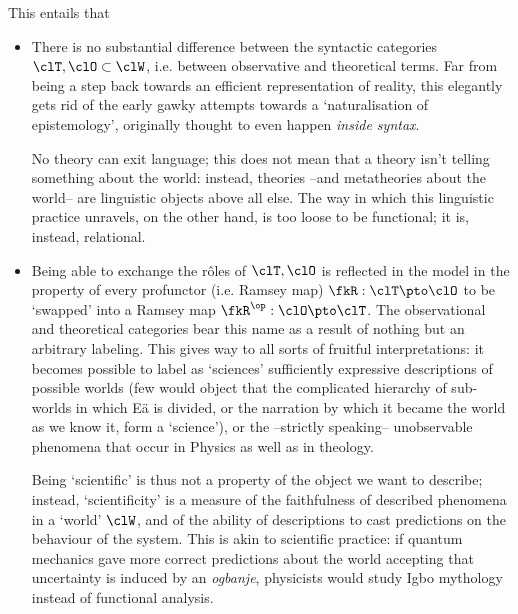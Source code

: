 This entails that
\begin{itemize}
	\item There is no substantial difference between the syntactic categories $\clT,\clO\subset \clW$, i.e. between observative and theoretical terms. Far from being a step back towards an efficient representation of reality, this elegantly gets rid of the early gawky attempts towards a `naturalisation of epistemology', originally thought to even happen \emph{inside syntax}.

	      No theory can exit language; this does not mean that a theory isn't telling something about the world: instead, theories --and metatheories about the world-- are linguistic objects above all else. The way in which this linguistic practice unravels, on the other hand, is too loose to be functional; it is, instead, relational.
	\item Being able to exchange the r\^oles of $\clT,\clO$ is reflected in the model in the property of every profunctor (i.e. Ramsey map) $\fkR : \clT \pto \clO$ to be `swapped' into a Ramsey map $\fkR^\op : \clO \pto \clT$. The observational and theoretical categories bear this name as a result of nothing but an arbitrary labeling. This gives way to all sorts of fruitful interpretations: it becomes possible to label as `sciences' sufficiently expressive descriptions of possible worlds (few would object that the complicated hierarchy of sub-worlds in which Eä is divided, or the narration by which it became the world as we know it, form a `science'), or the --strictly speaking-- unobservable phenomena that occur in Physics as well as in theology.

	      Being `scientific' is thus not a property of the object we want to describe; instead, `scientificity' is a measure of the faithfulness of described phenomena in a `world' $\clW$, and of the ability of descriptions to cast predictions on the behaviour of the system. This is akin to scientific practice: if quantum mechanics gave more correct predictions about the world accepting that uncertainty is induced by an \emph{ogbanje}, physicists would study Igbo mythology instead of functional analysis.

\end{itemize}